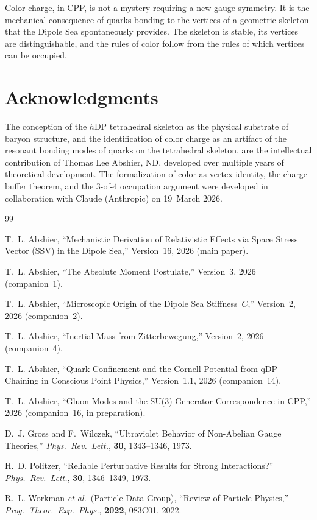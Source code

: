 \documentclass[12pt]{article}
\newcommand{\hDP}{h\mathrm{DP}}
\begin{document}
Color charge, in CPP, is not a mystery requiring a new gauge
symmetry.  It is the mechanical consequence of quarks bonding to
the vertices of a geometric skeleton that the Dipole Sea
spontaneously provides.  The skeleton is stable, its vertices are
distinguishable, and the rules of color follow from the rules of
which vertices can be occupied.

\section*{Acknowledgments}

The conception of the $\hDP$ tetrahedral skeleton as the physical
substrate of baryon structure, and the identification of color charge
as an artifact of the resonant bonding modes of quarks on the
tetrahedral skeleton, are the intellectual contribution of Thomas Lee
Abshier, ND, developed over multiple years of theoretical development.
The formalization of color as vertex identity, the charge buffer
theorem, and the 3-of-4 occupation argument were developed in
collaboration with Claude (Anthropic) on 19~March 2026.

\begin{thebibliography}{99}

T.~L. Abshier,
``Mechanistic Derivation of Relativistic Effects via Space Stress
Vector (SSV) in the Dipole Sea,''
Version~16, 2026 (main paper).

T.~L. Abshier,
``The Absolute Moment Postulate,''
Version~3, 2026 (companion~1).

T.~L. Abshier,
``Microscopic Origin of the Dipole Sea Stiffness~$C$,''
Version~2, 2026 (companion~2).

T.~L. Abshier,
``Inertial Mass from Zitterbewegung,''
Version~2, 2026 (companion~4).

T.~L. Abshier,
``Quark Confinement and the Cornell Potential from qDP Chaining
in Conscious Point Physics,''
Version~1.1, 2026 (companion~14).

T.~L. Abshier,
``Gluon Modes and the SU(3) Generator Correspondence in CPP,''
2026 (companion~16, in preparation).

D.~J. Gross and F.~Wilczek,
``Ultraviolet Behavior of Non-Abelian Gauge Theories,''
\textit{Phys.\ Rev.\ Lett.}, \textbf{30}, 1343--1346, 1973.

H.~D. Politzer,
``Reliable Perturbative Results for Strong Interactions?''
\textit{Phys.\ Rev.\ Lett.}, \textbf{30}, 1346--1349, 1973.

R.~L. Workman \textit{et al.}\ (Particle Data Group),
``Review of Particle Physics,''
\textit{Prog.\ Theor.\ Exp.\ Phys.}, \textbf{2022}, 083C01, 2022.

\end{thebibliography}
\end{document}
